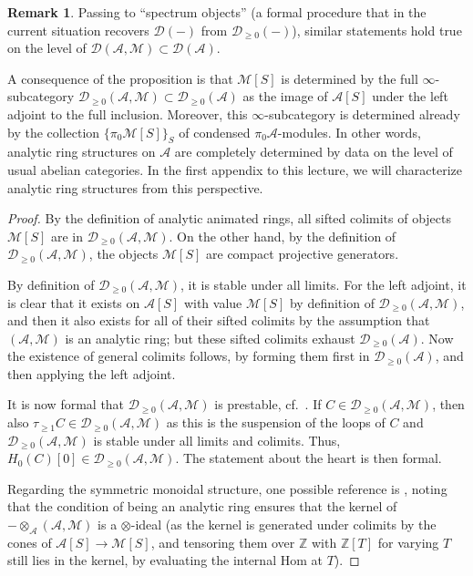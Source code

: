 \documentclass[11pt]{amsbook}
\numberwithin{equation}{section}
\numberwithin{theorem}{section}
\theoremstyle{definition}
\newtheorem{remark}[theorem]{Remark}
\begin{document}
\begin{remark} Passing to ``spectrum objects'' (a formal procedure that in the current situation recovers $\mathcal D(-)$ from $\mathcal D_{\geq 0}(-)$), similar statements hold true on the level of $\mathcal D(\mathcal A,\mathcal M)\subset \mathcal D(\mathcal A)$.
\end{remark}

A consequence of the proposition is that $\mathcal M[S]$ is determined by the full $\infty$-subcategory $\mathcal D_{\geq 0}(\mathcal A,\mathcal M)\subset \mathcal D_{\geq 0}(\mathcal A)$ as the image of $\mathcal A[S]$ under the left adjoint to the full inclusion. Moreover, this $\infty$-subcategory is determined already by the collection $\{\pi_0 \mathcal M[S]\}_S$ of condensed $\pi_0 \mathcal A$-modules. In other words, analytic ring structures on $\mathcal A$ are completely determined by data on the level of usual abelian categories. In the first appendix to this lecture, we will characterize analytic ring structures from this perspective.

\begin{proof} By the definition of analytic animated rings, all sifted colimits of objects $\mathcal M[S]$ are in $\mathcal D_{\geq 0}(\mathcal A,\mathcal M)$. On the other hand, by the definition of $\mathcal D_{\geq 0}(\mathcal A,\mathcal M)$, the objects $\mathcal M[S]$ are compact projective generators.

By definition of $\mathcal D_{\geq 0}(\mathcal A,\mathcal M)$, it is stable under all limits. For the left adjoint, it is clear that it exists on $\mathcal A[S]$ with value $\mathcal M[S]$ by definition of $\mathcal D_{\geq 0}(\mathcal A,\mathcal M)$, and then it also exists for all of their sifted colimits by the assumption that $(\mathcal A,\mathcal M)$ is an analytic ring; but these sifted colimits exhaust $\mathcal D_{\geq 0}(\mathcal A)$. Now the existence of general colimits follows, by forming them first in $\mathcal D_{\geq 0}(\mathcal A)$, and then applying the left adjoint.

It is now formal that $\mathcal D_{\geq 0}(\mathcal A,\mathcal M)$ is prestable, cf.~\cite[Corollary C.1.2.3]{LurieSAG}. If $C\in \mathcal D_{\geq 0}(\mathcal A,\mathcal M)$, then also $\tau_{\geq 1} C\in \mathcal D_{\geq 0}(\mathcal A,\mathcal M)$ as this is the suspension of the loops of $C$ and $\mathcal D_{\geq 0}(\mathcal A,\mathcal M)$ is stable under all limits and colimits. Thus, $H_0(C)[0]\in \mathcal D_{\geq 0}(\mathcal A,\mathcal M)$. The statement about the heart is then formal.

Regarding the symmetric monoidal structure, one possible reference is \cite[Theorem I.3.6]{NikolausScholze}, noting that the condition of being an analytic ring ensures that the kernel of $-\otimes_{\mathcal A} (\mathcal A,\mathcal M)$ is a $\otimes$-ideal (as the kernel is generated under colimits by the cones of $\mathcal A[S]\to \mathcal M[S]$, and tensoring them over $\mathbb Z$ with $\mathbb Z[T]$ for varying $T$ still lies in the kernel, by evaluating the internal Hom at $T$).
\end{proof}
\end{document}
